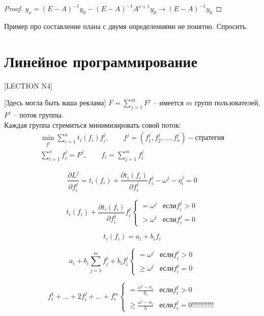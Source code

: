 \documentclass[12pt,a4paper,titlepage,oneside]{book}
\theoremstyle{definition}
\theoremstyle{plain}
\theoremstyle{remark}
\theoremstyle{remark}
\theoremstyle{plain}
\theoremstyle{plain}
\begin{document}
\begin{proof}
$y_{\nu} = (E-A)^{-1}y_0 - (E-A)^{-1}A^{\nu+1}y_0 \to (E-A)^{-1}y_0$
\end{proof}



Пример про составление плана с двумя определениями не понятно. Спросить.
\chapter{Линейное программирование}

[LECTION N4]

[Здесь могла быть ваша реклама]
$F = \sum\limits_{j=1}^m F^j$ -- имеется $m$ групп пользователей,
$F^j$ -- поток группы.\\ 
Каждая группа стремиться минимизировать совой поток:
\begin{gather*}
\min\limits_{f^j} \sum\limits_{i=1}^n t_i(f_i)f_i^j, \qquad f^j = (f_1^j, f_2^j, \dots, f_n^j) - \text{стратегия} \\
\sum\limits_{i=1}^n f_i^j = F^j, \qquad f_i = \sum\limits_{j=1}^m f_i^j
\end{gather*}

\begin{equation*}
\frac{\partial L^j}{\partial f_i^j} = t_i(f_i)+ \frac{\partial t_i(f_i)}{\partial f_i^j}f_i^j - \omega^j-\eta_i^j = 0
\end{equation*}

\begin{equation*}
t_i(f_i) + \frac{\partial t_i(f_i)}{\partial f_i^j}f_i^j \begin{cases} = \omega^j & если f_i^j > 0\\
> \omega^j & если f_i^j = 0 
\end{cases}
\end{equation*}

\begin{equation*}
t_i(f_i) = a_i + b_if_i
\end{equation*}

\begin{equation*}
a_i+b_i \sum\limits_{j=1}^m f_i^j + b_i f_i^j \begin{cases} = \omega^j & если f_i^j > 0\\
\geq \omega^j & если f_i^j = 0 
\end{cases}
\end{equation*}

\begin{equation*}
f_i^1+ \dots + 2f_i^j+ \dots +  f_i^m  \begin{cases} = \frac{\omega^j -a_i}{b_i} & если f_i^j > 0\\
\geq \frac{\omega^j -a_i}{b} & если f_i^j = 0 \text{!!!!!!!!!!!}
\end{cases}
\end{equation*}
\end{document}
